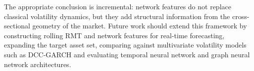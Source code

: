 The appropriate conclusion is incremental: network features do not replace classical volatility dynamics, but they add structural information from the cross-sectional geometry of the market. Future work should extend this framework by constructing rolling RMT and network features for real-time forecasting, expanding the target asset set, comparing against multivariate volatility models such as DCC-GARCH and evaluating temporal neural network and graph neural network architectures.
